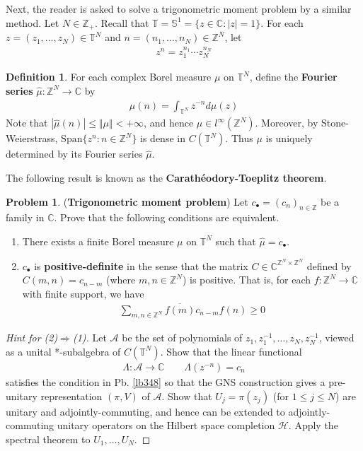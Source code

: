 \documentclass[12pt,b5paper,notitlepage]{article}
\theoremstyle{definition}
\newtheorem{df}{Definition}[subsection]
\newtheorem{prob}{\color{red}Problem}[section]
\theoremstyle{plain}
\newcommand{\wht}{\widehat}
\newcommand{\ovl}{\overline}
\newcommand{\Span}{\mathrm{Span}}
\newcommand{\blt}{\bullet}
\newcommand{\Cbb}{\mathbb C}
\newcommand{\Zbb}{\mathbb Z}
\newcommand{\Tbb}{\mathbb T}
\newcommand{\Sbb}{{\mathbb S}}
\newcommand{\MH}{\mathcal H}
\newcommand{\SA}{\mathscr A}
\numberwithin{equation}{section}
\begin{document}
Next, the reader is asked to solve a trigonometric moment problem by a similar method. Let $N\in\Zbb_+$. Recall that $\Tbb=\Sbb^1=\{z\in\Cbb:|z|=1\}$. For each $z=(z_1,\dots,z_N)\in\Tbb^N$ and $n=(n_1,\dots,n_N)\in\Zbb^N$, let
\begin{align}
z^n=z_1^{n_1}\cdots z_N^{n_N}
\end{align}

\begin{df}
For each complex Borel measure $\mu$ on $\Tbb^N$, define the \textbf{Fourier series} $\wht\mu:\Zbb^N\rightarrow\Cbb$ by  \index{zz@$\wht\mu$, the Fouerier series of $\mu$}
\begin{align*}
\wht\mu(n)=\int_{\Tbb^N}z^{-n}d\mu(z)
\end{align*} 
Note that $|\wht\mu(n)|\leq \Vert\mu\Vert<+\infty$, and hence $\wht\mu\in l^\infty(\Zbb^N)$. Moreover, by Stone-Weierstrass, $\Span\{z^n:n\in\Zbb^N\}$ is dense in $C(\Tbb^N)$. Thus $\mu$ is uniquely determined by its Fourier series $\wht\mu$.
\end{df}

The following result is known as the \textbf{Carath\'eodory-Toeplitz theorem}. 

\begin{prob}(\textbf{Trigonometric moment problem})  
Let $c_\blt=(c_n)_{n\in\Zbb}$ be a family in $\Cbb$. Prove that the following conditions are equivalent.
\begin{enumerate}
\item[(1)] There exists a finite Borel measure $\mu$ on $\Tbb^N$ such that $\wht\mu=c_\blt$.
\item[(2)] $c_\blt$ is \textbf{positive-definite} in the sense that the matrix $C\in\Cbb^{\Zbb^N\times\Zbb^N}$ defined by $C(m,n)=c_{n-m}$ (where $m,n\in\Zbb^N$) is positive. That is, for each $f:\Zbb^N\rightarrow\Cbb$ with finite support, we have
\begin{align*}
\sum_{m,n\in\Zbb^N}\ovl{f(m)}c_{n-m}f(n)\geq0
\end{align*}
\end{enumerate}
\end{prob}


\begin{proof}[Hint for (2)$\Rightarrow$(1)]
Let $\SA$ be the set of polynomials of $z_1,z_1^{-1},\dots,z_N,z_N^{-1}$, viewed as a unital *-subalgebra of $C(\Tbb^N)$. Show that the linear functional
\begin{align*}
\Lambda:\SA\rightarrow\Cbb\qquad \Lambda(z^{-n})=c_n
\end{align*}
satisfies the condition in Pb. \ref{lb348} so that the GNS construction gives a pre-unitary representation $(\pi,V)$ of $\SA$. Show that $U_j=\pi(z_j)$ (for $1\leq j\leq N$) are unitary and adjointly-commuting, and hence can be extended to adjointly-commuting unitary operators on the Hilbert space completion $\MH$. Apply the spectral theorem to $U_1,\dots,U_N$. 
\end{proof}
\end{document}
